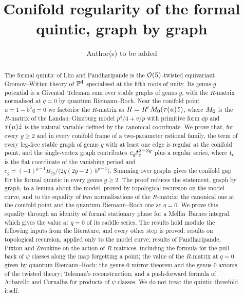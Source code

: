 \documentclass[11pt, reqno]{amsart}
\title[The formal quintic at the conifold point]{Conifold regularity of the formal quintic, graph by graph\protect\draftnote{Working title; to be settled by the authors.}}
\author{Author(s) to be added}
\begin{document}
\begin{abstract}
The formal quintic of Lho and Pandharipande is the $\mathcal{O}(5)$-twisted equivariant Gromov--Witten theory of $\mathbb{P}^4$ specialised at the fifth roots of unity. Its genus-$g$ potential is a Givental--Teleman sum over stable graphs of genus $g$, with the $R$-matrix normalised at $q=0$ by quantum Riemann--Roch. Near the conifold point $u=1-5^5q=0$ we factorise the $R$-matrix as $R=R'\,M_{0}(\tau(u)\hat{z})$, where $M_{0}$ is the $R$-matrix of the Landau--Ginzburg model $p^4/4+v/p$ with primitive form $\dd p$ and $\tau(u)\hat{z}$ is the natural variable defined by the canonical coordinate. We prove that, for every $g\geq 2$ and in every conifold frame of a two-parameter rational family, the term of every leg-free stable graph of genus $g$ with at least one edge is regular at the conifold point, and the single-vertex graph contributes $c_gt_{\mathrm{c}}^{2-2g}$ plus a regular series, where $t_{\mathrm{c}}$ is the flat coordinate of the vanishing period and $c_g=(-1)^{g-1}B_{2g}/\bigl(2g(2g-2)\,5^{g-1}\bigr)$. Summing over graphs gives the conifold gap for the formal quintic in every genus $g\geq2$. The proof reduces the statement, graph by graph, to a lemma about the model, proved by topological recursion on the model curve, and to the equality of two normalisations of the $R$-matrix: the canonical one at the conifold point and the quantum Riemann--Roch one at $q=0$. We prove this equality through an identity of formal stationary phase for a Mellin--Barnes integral, which gives the value at $q=0$ of its saddle series. The results hold modulo the following inputs from the literature, and every other step is proved: results on topological recursion, applied only to the model curve; results of Pandharipande, Pixton and Zvonkine on the action of $R$-matrices, including the formula for the pull-back of $\psi$ classes along the map forgetting a point; the value of the $R$-matrix at $q=0$ given by quantum Riemann--Roch; the genus-$0$ mirror theorem and the genus-$0$ axioms of the twisted theory; Teleman's reconstruction; and a push-forward formula of Arbarello and Cornalba for products of $\psi$ classes. We do not treat the quintic threefold itself.
\end{abstract}

\maketitle

\setcounter{tocdepth}{1}
\tableofcontents













\appendix









\end{document}

